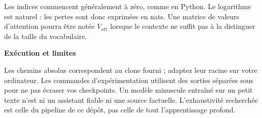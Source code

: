 \documentclass[a4paper,11pt]{article}
\begin{document}
Les indices commencent généralement à zéro, comme en Python. Le logarithme
est naturel : les pertes sont donc exprimées en nats. Une matrice de valeurs
d'attention pourra être notée $V_{\mathrm{att}}$ lorsque le contexte ne suffit
pas à la distinguer de la taille du vocabulaire.

\textbf{Exécution et limites}

Les chemins absolus correspondent au clone fourni ; adaptez leur racine sur
votre ordinateur. Les commandes d'expérimentation utilisent des sorties
séparées sous  pour ne pas écraser vos checkpoints. Un modèle
minuscule entraîné sur un petit texte n'est ni un assistant fiable ni une
source factuelle. L'exhaustivité recherchée est celle du pipeline de ce dépôt,
pas celle de tout l'apprentissage profond.

\clearpage
\begingroup
\small
\setlength{\parskip}{0pt}
\tableofcontents
\endgroup





\end{document}
